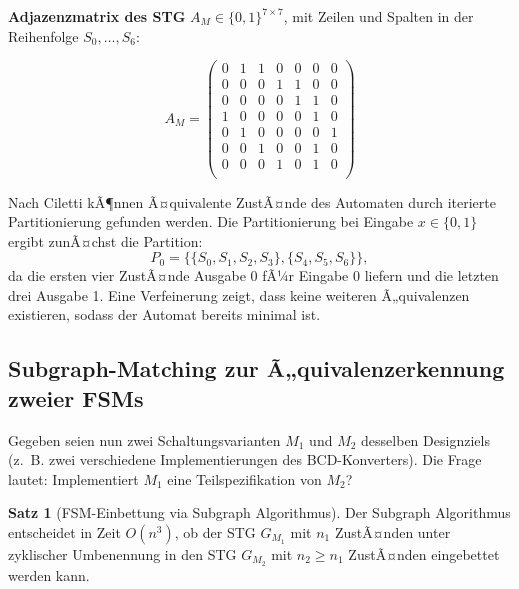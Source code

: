 ﻿\documentclass[a4paper,12pt]{article}
\theoremstyle{definition}
\newtheorem{satz}{Satz}
\begin{document}
\textbf{Adjazenzmatrix des STG} $A_M \in \{0,1\}^{7 \times 7}$, mit Zeilen und Spalten
in der Reihenfolge $S_0, \ldots, S_6$:

\[
A_M =
\begin{pmatrix}
  0 & 1 & 1 & 0 & 0 & 0 & 0 \\
  0 & 0 & 0 & 1 & 1 & 0 & 0 \\
  0 & 0 & 0 & 0 & 1 & 1 & 0 \\
  1 & 0 & 0 & 0 & 0 & 1 & 0 \\
  0 & 1 & 0 & 0 & 0 & 0 & 1 \\
  0 & 0 & 1 & 0 & 0 & 1 & 0 \\
  0 & 0 & 0 & 1 & 0 & 1 & 0 \\
\end{pmatrix}
\]

Nach Ciletti \cite[S.~95]{ciletti2011} kÃ¶nnen Ã¤quivalente ZustÃ¤nde des Automaten
durch iterierte Partitionierung gefunden werden. Die Partitionierung bei Eingabe
$x \in \{0,1\}$ ergibt zunÃ¤chst die Partition:
\[
  P_0 = \{\{S_0, S_1, S_2, S_3\}, \{S_4, S_5, S_6\}\},
\]
da die ersten vier ZustÃ¤nde Ausgabe 0 fÃ¼r Eingabe 0 liefern und die letzten drei
Ausgabe 1. Eine Verfeinerung zeigt, dass keine weiteren Ã„quivalenzen existieren,
sodass der Automat bereits minimal ist.

\subsection{Subgraph-Matching zur Ã„quivalenzerkennung zweier FSMs}

Gegeben seien nun zwei Schaltungsvarianten $M_1$ und $M_2$ desselben Designziels
(z.~B. zwei verschiedene Implementierungen des BCD-Konverters). Die Frage lautet:
Implementiert $M_1$ eine Teilspezifikation von $M_2$?

\begin{satz}[FSM-Einbettung via Subgraph Algorithmus]\label{satz:fsm}
  Der Subgraph Algorithmus entscheidet in Zeit $O(n^3)$, ob der STG $G_{M_1}$ mit
  $n_1$ ZustÃ¤nden unter zyklischer Umbenennung in den STG $G_{M_2}$ mit $n_2 \geq n_1$
  ZustÃ¤nden eingebettet werden kann.
\end{satz}
\end{document}
